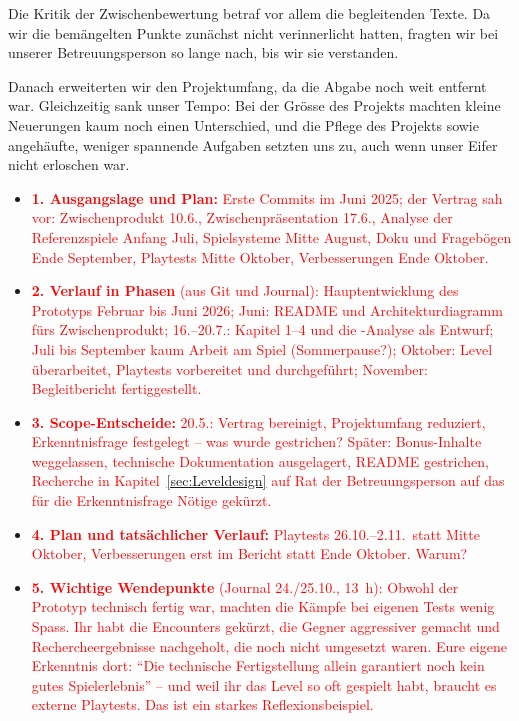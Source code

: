 \documentclass[../Main.tex]{subfiles}
\begin{document}
Die Kritik der Zwischenbewertung betraf vor allem die begleitenden Texte. Da wir die bemängelten Punkte zunächst nicht verinnerlicht hatten, fragten wir bei unserer Betreuungsperson so lange nach, bis wir sie verstanden.

Danach erweiterten wir den Projektumfang, da die Abgabe noch weit entfernt war. Gleichzeitig sank unser Tempo: Bei der Grösse des Projekts machten kleine Neuerungen kaum noch einen Unterschied, und die Pflege des Projekts sowie angehäufte, weniger spannende Aufgaben setzten uns zu, auch wenn unser Eifer nicht erloschen war.

\begin{itemize}[leftmargin=1.5cm]
    \item \textcolor{red}{\textbf{1. Ausgangslage und Plan:} Erste Commits im Juni 2025; der Vertrag sah vor: Zwischenprodukt 10.6., Zwischenpräsentation 17.6., Analyse der Referenzspiele Anfang Juli, Spielsysteme Mitte August, Doku und Fragebögen Ende September, Playtests Mitte Oktober, Verbesserungen Ende Oktober.}
    \item \textcolor{red}{\textbf{2. Verlauf in Phasen} (aus Git und Journal): Hauptentwicklung des Prototyps Februar bis Juni 2026; Juni: README und Architekturdiagramm fürs Zwischenprodukt; 16.--20.7.: Kapitel 1--4 und die -Analyse als Entwurf; Juli bis September kaum Arbeit am Spiel (Sommerpause?); Oktober: Level überarbeitet, Playtests vorbereitet und durchgeführt; November: Begleitbericht fertiggestellt.}
    \item \textcolor{red}{\textbf{3. Scope-Entscheide:} 20.5.: Vertrag bereinigt, Projektumfang reduziert, Erkenntnisfrage festgelegt -- was wurde gestrichen? Später: Bonus-Inhalte weggelassen, technische Dokumentation ausgelagert, README gestrichen, Recherche in Kapitel~\ref{sec:Leveldesign} auf Rat der Betreuungsperson auf das für die Erkenntnisfrage Nötige gekürzt.}
    \item \textcolor{red}{\textbf{4. Plan und tatsächlicher Verlauf:} Playtests 26.10.--2.11.\ statt Mitte Oktober, Verbesserungen erst im Bericht statt Ende Oktober. Warum?}
    \item \textcolor{red}{\textbf{5. Wichtige Wendepunkte} (Journal 24./25.10., 13~h): Obwohl der Prototyp technisch fertig war, machten die Kämpfe bei eigenen Tests wenig Spass. Ihr habt die Encounters gekürzt, die Gegner aggressiver gemacht und Rechercheergebnisse nachgeholt, die noch nicht umgesetzt waren. Eure eigene Erkenntnis dort: \enquote{Die technische Fertigstellung allein garantiert noch kein gutes Spielerlebnis} -- und weil ihr das Level so oft gespielt habt, braucht es externe Playtests. Das ist ein starkes Reflexionsbeispiel.}

\end{itemize}
\end{document}
